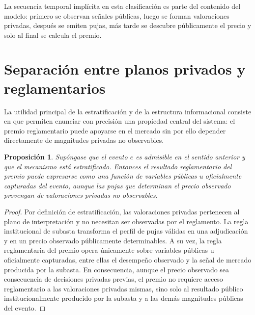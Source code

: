 \documentclass[11pt,a4paper]{article}
\newtheorem{proposicion}{Proposición}
\theoremstyle{definition}
\begin{document}
La secuencia temporal implícita en esta clasificación es parte del contenido del modelo: primero se observan señales públicas, luego se forman valoraciones privadas, después se emiten pujas, más tarde se descubre públicamente el precio y solo al final se calcula el premio.

\section{Separación entre planos privados y reglamentarios}

La utilidad principal de la estratificación y de la estructura informacional consiste en que permiten enunciar con precisión una propiedad central del sistema: el premio reglamentario puede apoyarse en el mercado sin por ello depender directamente de magnitudes privadas no observables.

\begin{proposicion}\label{prop:separacion-planos}
Supóngase que el evento $e$ es admisible en el sentido anterior y que el mecanismo está estratificado. Entonces el resultado reglamentario del premio puede expresarse como una función de variables públicas u oficialmente capturadas del evento, aunque las pujas que determinan el precio observado provengan de valoraciones privadas no observables.
\end{proposicion}

\begin{proof}
Por definición de estratificación, las valoraciones privadas pertenecen al plano de interpretación y no necesitan ser observadas por el reglamento. La regla institucional de subasta transforma el perfil de pujas válidas en una adjudicación y en un precio observado públicamente determinables. A su vez, la regla reglamentaria del premio opera únicamente sobre variables públicas u oficialmente capturadas, entre ellas el desempeño observado y la señal de mercado producida por la subasta. En consecuencia, aunque el precio observado sea consecuencia de decisiones privadas previas, el premio no requiere acceso reglamentario a las valoraciones privadas mismas, sino solo al resultado público institucionalmente producido por la subasta y a las demás magnitudes públicas del evento.
\end{proof}
\end{document}
